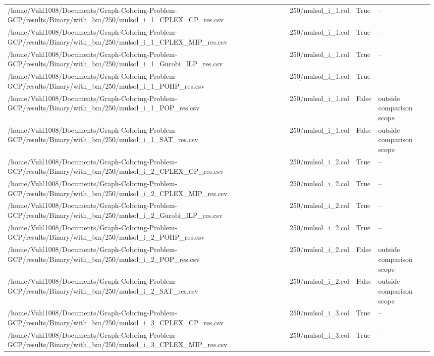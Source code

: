 \begin{table}[htbp]
\begin{tabular}{llll}
/home/Vuhl1008/Documents/Graph-Coloring-Problem-GCP/results/Binary/with\_bm/250/mulsol\_i\_1\_CPLEX\_CP\_res.csv & 250/mulsol\_i\_1.col & True & -- \\
/home/Vuhl1008/Documents/Graph-Coloring-Problem-GCP/results/Binary/with\_bm/250/mulsol\_i\_1\_CPLEX\_MIP\_res.csv & 250/mulsol\_i\_1.col & True & -- \\
/home/Vuhl1008/Documents/Graph-Coloring-Problem-GCP/results/Binary/with\_bm/250/mulsol\_i\_1\_Gurobi\_ILP\_res.csv & 250/mulsol\_i\_1.col & True & -- \\
/home/Vuhl1008/Documents/Graph-Coloring-Problem-GCP/results/Binary/with\_bm/250/mulsol\_i\_1\_POHP\_res.csv & 250/mulsol\_i\_1.col & True & -- \\
/home/Vuhl1008/Documents/Graph-Coloring-Problem-GCP/results/Binary/with\_bm/250/mulsol\_i\_1\_POP\_res.csv & 250/mulsol\_i\_1.col & False & outside comparison scope \\
/home/Vuhl1008/Documents/Graph-Coloring-Problem-GCP/results/Binary/with\_bm/250/mulsol\_i\_1\_SAT\_res.csv & 250/mulsol\_i\_1.col & False & outside comparison scope \\
/home/Vuhl1008/Documents/Graph-Coloring-Problem-GCP/results/Binary/with\_bm/250/mulsol\_i\_2\_CPLEX\_CP\_res.csv & 250/mulsol\_i\_2.col & True & -- \\
/home/Vuhl1008/Documents/Graph-Coloring-Problem-GCP/results/Binary/with\_bm/250/mulsol\_i\_2\_CPLEX\_MIP\_res.csv & 250/mulsol\_i\_2.col & True & -- \\
/home/Vuhl1008/Documents/Graph-Coloring-Problem-GCP/results/Binary/with\_bm/250/mulsol\_i\_2\_Gurobi\_ILP\_res.csv & 250/mulsol\_i\_2.col & True & -- \\
/home/Vuhl1008/Documents/Graph-Coloring-Problem-GCP/results/Binary/with\_bm/250/mulsol\_i\_2\_POHP\_res.csv & 250/mulsol\_i\_2.col & True & -- \\
/home/Vuhl1008/Documents/Graph-Coloring-Problem-GCP/results/Binary/with\_bm/250/mulsol\_i\_2\_POP\_res.csv & 250/mulsol\_i\_2.col & False & outside comparison scope \\
/home/Vuhl1008/Documents/Graph-Coloring-Problem-GCP/results/Binary/with\_bm/250/mulsol\_i\_2\_SAT\_res.csv & 250/mulsol\_i\_2.col & False & outside comparison scope \\
/home/Vuhl1008/Documents/Graph-Coloring-Problem-GCP/results/Binary/with\_bm/250/mulsol\_i\_3\_CPLEX\_CP\_res.csv & 250/mulsol\_i\_3.col & True & -- \\
/home/Vuhl1008/Documents/Graph-Coloring-Problem-GCP/results/Binary/with\_bm/250/mulsol\_i\_3\_CPLEX\_MIP\_res.csv & 250/mulsol\_i\_3.col & True & -- \\

\end{tabular}
\end{table}
